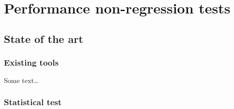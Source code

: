 \chapter{Performance non-regression tests}%
\label{chapter:experiment:tests}

    \section{State of the art}%
        \subsection{Existing tools}%
        \label{sub:existing_tools}

            Some text\dots

        \subsection{Statistical test}%
        \label{sub:statistical_test}

